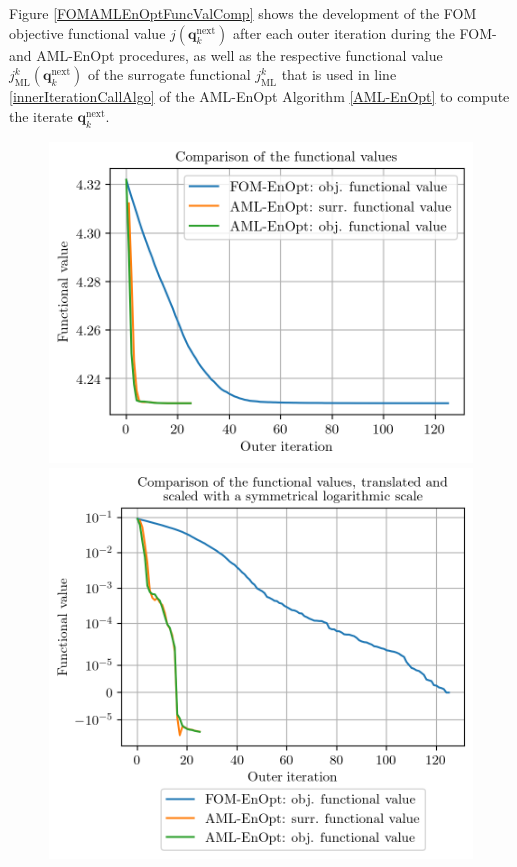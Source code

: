 Figure \ref{FOMAMLEnOptFuncValComp} shows the development of the FOM objective functional value $j(\mathbf{q}^\mathrm{next}_k)$ after each outer iteration during the FOM- and AML-EnOpt procedures, as well as the respective functional value $j^k_\mathrm{ML}(\mathbf{q}^\mathrm{next}_k)$ of the surrogate functional $j_\mathrm{ML}^k$ that is used in line \ref{innerIterationCallAlgo} of the AML-EnOpt Algorithm \ref{AML-EnOpt} to compute the iterate $\mathbf{q}^\mathrm{next}_k$.

\begin{figure}
\centering
\includegraphics{Plots/functionalValueComp.png}
\includegraphics{Plots/functionalValueCompSymlog.png}

\end{figure}
